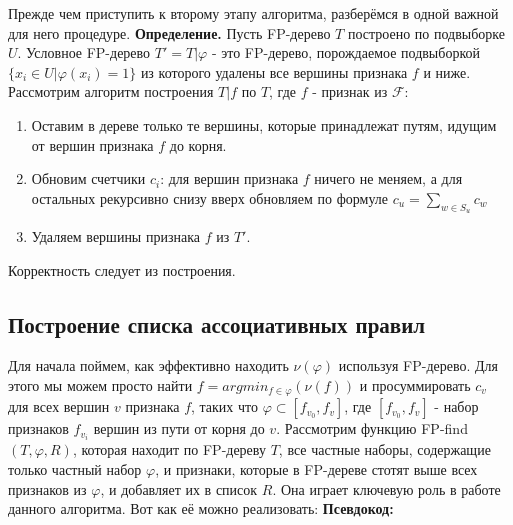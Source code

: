 Прежде чем приступить к второму этапу алгоритма, разберёмся в одной важной для него процедуре. 
\newline\newline
\textbf{Определение.} Пусть FP-дерево $T$ построено по подвыборке $U$. Условное FP-дерево $T' = T|\varphi$ - это FP-дерево, порождаемое подвыборкой $\{x_i \in U| \varphi(x_i) = 1 \}$ из которого удалены все вершины признака $f$ и ниже.
\newline\newline
Рассмотрим алгоритм построения $T|f$ по $T$, где $f$ - признак из $\mathcal{F}$:
\begin{enumerate}
    \item Оставим в дереве только те вершины, которые принадлежат путям, идущим от вершин признака $f$ до корня. 
    \item Обновим счетчики $c_i$: для вершин признака $f$ ничего не меняем, а для остальных рекурсивно снизу вверх обновляем по формуле $c_u = \displaystyle\sum_{w \in S_u} c_w$
    \item Удаляем вершины признака $f$ из $T'$.
\end{enumerate}

Корректность следует из построения.

\subsection{Построение списка ассоциативных правил}

Для начала поймем, как эффективно находить $\nu(\varphi)$ используя FP-дерево. Для этого мы можем просто найти $f =argmin_{f \in \varphi} (\nu(f))$ и просуммировать $c_v$ для всех вершин $v$ признака $f$, таких что $\varphi \subset [f_{v_0}, f_{v}]$, где $[f_{v_0}, f_{v}]$ - набор признаков $f_{v_i}$ вершин из пути от корня до $v$.
\newline\newline
Рассмотрим функцию FP-find$(T,\varphi,R)$, которая находит по FP-дереву $T$, все частные наборы, содержащие только частный набор $\varphi$, и признаки, которые в FP-дереве стотят выше всех признаков из $\varphi$, и добавляет их в список $R$. Она играет ключевую роль в работе данного алгоритма. Вот как её можно реализовать:
\newline\newline
\textbf{Псевдокод:}

